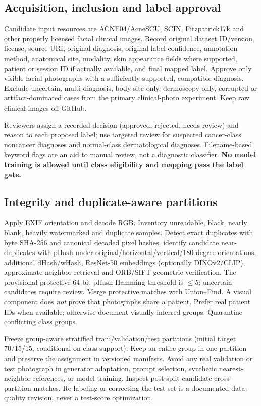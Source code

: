\documentclass[11pt,a4paper]{article}
\begin{document}
\subsection{Acquisition, inclusion and label approval}
Candidate input resources are ACNE04/AcneSCU, SCIN, Fitzpatrick17k and other properly licensed facial clinical images. Record original dataset ID/version, license, source URI, original diagnosis, original label confidence, annotation method, anatomical site, modality, skin appearance fields where supported, patient or session ID if actually available, and final mapped label. Approve only visible facial photographs with a sufficiently supported, compatible diagnosis. Exclude uncertain, multi-diagnosis, body-site-only, dermoscopy-only, corrupted or artifact-dominated cases from the primary clinical-photo experiment. Keep raw clinical images off GitHub.

Reviewers assign a recorded decision (approved, rejected, needs-review) and reason to each proposed label; use targeted review for suspected cancer-class noncancer diagnoses and normal-class dermatological diagnoses. Filename-based keyword flags are an aid to manual review, not a diagnostic classifier. \textbf{No model training is allowed until class eligibility and mapping pass the label gate.}

\subsection{Integrity and duplicate-aware partitions}
Apply EXIF orientation and decode RGB. Inventory unreadable, black, nearly blank, heavily watermarked and duplicate samples. Detect exact duplicates with byte SHA-256 and canonical decoded pixel hashes; identify candidate near-duplicates with pHash under original/horizontal/vertical/180-degree orientations, additional dHash/wHash, ResNet-50 embeddings (optionally DINOv2/CLIP), approximate neighbor retrieval and ORB/SIFT geometric verification. The provisional protective 64-bit pHash Hamming threshold is $\leq5$; uncertain candidates require review. Merge protective matches with Union--Find. A visual component does \emph{not} prove that photographs share a patient. Prefer real patient IDs when available; otherwise document visually inferred groups. Quarantine conflicting class groups.

Freeze group-aware stratified train/validation/test partitions (initial target 70/15/15, conditional on class support). Keep an entire group in one partition and preserve the assignment in versioned manifests. Avoid any real validation or test photograph in generator adaptation, prompt selection, synthetic nearest-neighbor references, or model training. Inspect post-split candidate cross-partition matches. Re-labeling or correcting the test set is a documented data-quality revision, never a test-score optimization.
\end{document}
